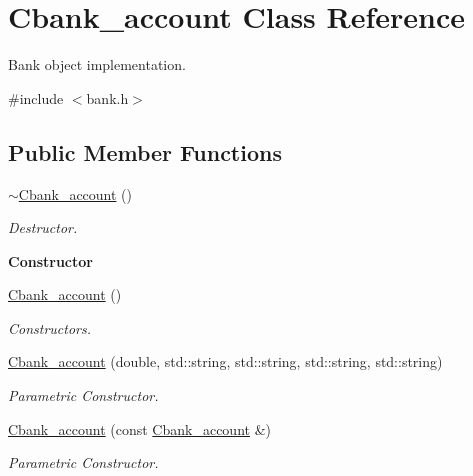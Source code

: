 \hypertarget{class_cbank__account}{\section{Cbank\+\_\+account Class Reference}
\label{class_cbank__account}
}


Bank object implementation.  




{\ttfamily \#include $<$bank.\+h$>$}

\subsection*{Public Member Functions}
\begin{DoxyCompactItemize}
\item 
\hypertarget{class_cbank__account_a6a445565be4138841cd9ae19a284c6a3}{\hyperlink{class_cbank__account_a6a445565be4138841cd9ae19a284c6a3}{$\sim$\+Cbank\+\_\+account} ()}\label{class_cbank__account_a6a445565be4138841cd9ae19a284c6a3}

\begin{DoxyCompactList}\small\item\em Destructor. \end{DoxyCompactList}\end{DoxyCompactItemize}
\begin{Indent}{\bf Constructor}\par
\begin{DoxyCompactItemize}
\item 
\hyperlink{class_cbank__account_ab33d4d440a059df6781a6007e02ecf60}{Cbank\+\_\+account} ()
\begin{DoxyCompactList}\small\item\em Constructors. \end{DoxyCompactList}\item 
\hyperlink{class_cbank__account_a28c9010a168144f84a2787db0940a8e8}{Cbank\+\_\+account} (double, std\+::string, std\+::string, std\+::string, std\+::string)
\begin{DoxyCompactList}\small\item\em Parametric Constructor. \end{DoxyCompactList}\item 
\hyperlink{class_cbank__account_ae249ba9bfa4100cdc8deff17133e2914}{Cbank\+\_\+account} (const \hyperlink{class_cbank__account}{Cbank\+\_\+account} \&)
\begin{DoxyCompactList}\small\item\em Parametric Constructor. \end{DoxyCompactList}\end{DoxyCompactItemize}
\end{Indent}
